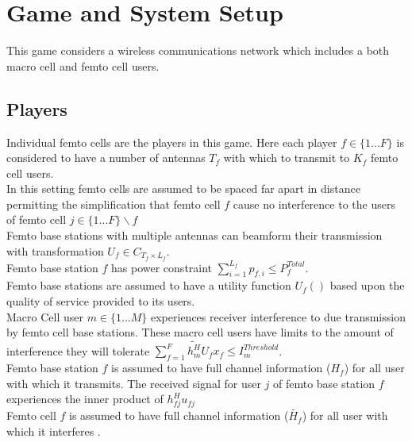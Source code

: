 \documentclass[12pt]{article}
\begin{document}
\section{Game and System Setup}

This game considers a wireless communications network which includes a both macro cell and femto cell users.

\subsection{Players}

Individual femto cells are the players in this game.
Here each player  $f \in \{1 ... F\}$ is considered to have a number of antennas $T_f$ with which to transmit to $K_f$ femto cell users.
\\

In this setting femto cells are assumed to be spaced far apart in distance permitting the simplification that 
femto cell $f$ cause no interference to the users of femto cell $j \in \{1 ... F\}\backslash f$
\\


Femto base stations with multiple antennas can beamform their transmission with transformation $U_f \in C_{T_f \times L_f}$.
\\

Femto base station $f$ has power constraint  $\sum^{L_f}_{i=1} p_{f,i} \leq P^{Total}_{f} $. 
\\

Femto base stations are assumed to have a utility function $U_f()$ based upon the quality of service provided to its users.
\\

Macro Cell user $m \in \{1 ... M\}$ experiences receiver interference to due transmission by  femto cell base stations. These macro cell users have limits to the amount of interference they will tolerate 
$\sum^F_{f=1} \tilde{h_m^H} U_f x_f \leq I^{Threshold}_{m} $.
\\

Femto base station $f$ is assumed to have full channel information ($H_f$) for all user  with which it transmits. The received signal for user $j$ of femto base station $f$ experiences the inner product of $h^H_{fj}u_{fj}$
\\


Femto cell $f$ is assumed to have full channel information ($\tilde{H_f}$) for all user with which it interferes .
\\
\end{document}
